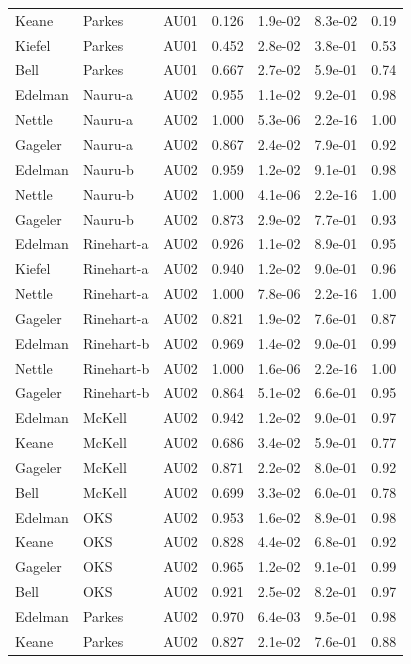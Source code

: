 \documentclass{monashthesis}
\begin{document}
\begin{center}
\begin{longtable}{lllllll}
Keane & Parkes & AU01 & 0.126 & 1.9e-02 & 8.3e-02 & 0.19 \\
Kiefel & Parkes & AU01 & 0.452 & 2.8e-02 & 3.8e-01 & 0.53 \\
Bell & Parkes & AU01 & 0.667 & 2.7e-02 & 5.9e-01 & 0.74 \\
Edelman & Nauru-a & AU02 & 0.955 & 1.1e-02 & 9.2e-01 & 0.98 \\
Nettle & Nauru-a & AU02 & 1.000 & 5.3e-06 & 2.2e-16 & 1.00 \\
Gageler & Nauru-a & AU02 & 0.867 & 2.4e-02 & 7.9e-01 & 0.92 \\
Edelman & Nauru-b & AU02 & 0.959 & 1.2e-02 & 9.1e-01 & 0.98 \\
Nettle & Nauru-b & AU02 & 1.000 & 4.1e-06 & 2.2e-16 & 1.00 \\
Gageler & Nauru-b & AU02 & 0.873 & 2.9e-02 & 7.7e-01 & 0.93 \\
Edelman & Rinehart-a & AU02 & 0.926 & 1.1e-02 & 8.9e-01 & 0.95 \\
Kiefel & Rinehart-a & AU02 & 0.940 & 1.2e-02 & 9.0e-01 & 0.96 \\
Nettle & Rinehart-a & AU02 & 1.000 & 7.8e-06 & 2.2e-16 & 1.00 \\
Gageler & Rinehart-a & AU02 & 0.821 & 1.9e-02 & 7.6e-01 & 0.87 \\
Edelman & Rinehart-b & AU02 & 0.969 & 1.4e-02 & 9.0e-01 & 0.99 \\
Nettle & Rinehart-b & AU02 & 1.000 & 1.6e-06 & 2.2e-16 & 1.00 \\
Gageler & Rinehart-b & AU02 & 0.864 & 5.1e-02 & 6.6e-01 & 0.95 \\
Edelman & McKell & AU02 & 0.942 & 1.2e-02 & 9.0e-01 & 0.97 \\
Keane & McKell & AU02 & 0.686 & 3.4e-02 & 5.9e-01 & 0.77 \\
Gageler & McKell & AU02 & 0.871 & 2.2e-02 & 8.0e-01 & 0.92 \\
Bell & McKell & AU02 & 0.699 & 3.3e-02 & 6.0e-01 & 0.78 \\
Edelman & OKS & AU02 & 0.953 & 1.6e-02 & 8.9e-01 & 0.98 \\
Keane & OKS & AU02 & 0.828 & 4.4e-02 & 6.8e-01 & 0.92 \\
Gageler & OKS & AU02 & 0.965 & 1.2e-02 & 9.1e-01 & 0.99 \\
Bell & OKS & AU02 & 0.921 & 2.5e-02 & 8.2e-01 & 0.97 \\
Edelman & Parkes & AU02 & 0.970 & 6.4e-03 & 9.5e-01 & 0.98 \\
Keane & Parkes & AU02 & 0.827 & 2.1e-02 & 7.6e-01 & 0.88 \\

\end{longtable}
\end{center}
\end{document}
